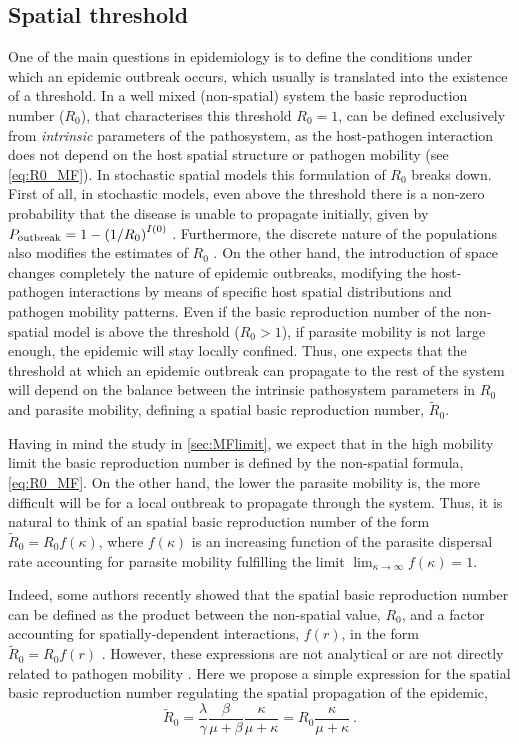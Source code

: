 \subsection{Spatial threshold}

One of the main questions in epidemiology is to define the conditions under
which an epidemic outbreak occurs, which usually is translated into the
existence of a threshold. In a well mixed (non-spatial) system the basic
reproduction number ($R_0$), that characterises this threshold $R_0=1$, can be
defined exclusively from \textit{intrinsic} parameters of the pathosystem, as
the host-pathogen interaction does not depend on the host spatial structure or
pathogen mobility (see \cref{eq:R0_MF}). In stochastic spatial models this
formulation of $R_0$ breaks down. First of all, in stochastic models, even
above the threshold there is a non-zero probability that the disease is unable
to propagate initially, given by
$P_{\textrm{outbreak}}=1-\left(1/R_0\right)^{I(0)}$ \cite{Brauer2008}.
Furthermore, the discrete nature of the populations also modifies the estimates
of $R_0$ \cite{KEELING200051}. On the other hand, the introduction of space
changes completely the nature of epidemic outbreaks, modifying the
host-pathogen interactions by means of specific host spatial distributions and
pathogen mobility patterns. Even if the basic reproduction number of the
non-spatial model is above the threshold ($R_0>1$), if parasite mobility is not
large enough, the epidemic will stay locally confined. Thus, one expects that
the threshold at which an epidemic outbreak can propagate to the rest of the
system will depend on the balance between the intrinsic pathosystem parameters
in $R_0$ and parasite mobility, defining a spatial basic reproduction number,
$\tilde{R}_0$.

Having in mind the study in \cref{sec:MFlimit}, we expect that in the high
mobility limit the basic reproduction number is defined by the non-spatial
formula, \cref{eq:R0_MF}. On the other hand, the lower the parasite mobility
is, the more difficult will be for a local outbreak to propagate through the
system. Thus, it is natural to think of an spatial basic reproduction number of
the form $\tilde{R}_0=R_0 f(\kappa)$, where $f(\kappa)$ is an increasing
function of the parasite dispersal rate accounting for parasite mobility
fulfilling the limit $\lim_{\kappa\to\infty}f(\kappa)=1$.

Indeed, some authors recently showed that the spatial basic reproduction
number can be defined as the product between the non-spatial value, $R_0$, and
a factor accounting for spatially-dependent interactions, $f(r)$, in the form
$\tilde{R}_0=R_0f(r)$ \cite{Filipe2003, Gilligan2021}. However, these
expressions are not analytical \cite{Filipe2003,Filipe2004} or are not directly
related to pathogen mobility \cite{Gilligan2021}. Here we propose a simple
expression for the spatial basic reproduction number regulating the spatial
propagation of the epidemic,
\begin{equation}\label{eq:R_0ibm}
    \tilde{R}_0=\frac{\lambda}{\gamma}\frac{\beta}{\mu+\beta}
    \frac{\kappa}{\mu+\kappa}=R_0\frac{\kappa}{\mu+\kappa}
    \ .
\end{equation}

